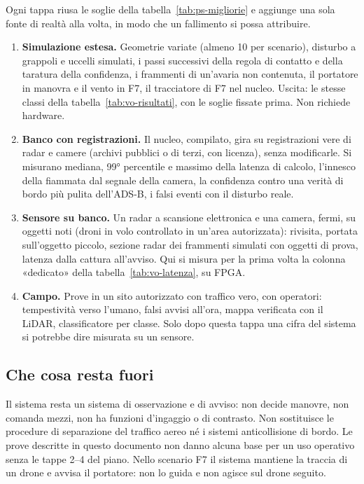 Ogni tappa riusa le soglie della tabella~\ref{tab:ps-migliorie} e aggiunge una sola fonte di realtà alla volta, in modo che un fallimento si possa attribuire.
\begin{enumerate}[label=\arabic*.]
\item \textbf{Simulazione estesa.} Geometrie variate (almeno 10 per scenario), disturbo a grappoli e uccelli simulati, i passi successivi della regola di contatto e della taratura della confidenza, i frammenti di un'avaria non contenuta, il portatore in manovra e il vento in F7, il tracciatore di F7 nel nucleo. Uscita: le stesse classi della tabella~\ref{tab:vo-risultati}, con le soglie fissate prima. Non richiede hardware.
\item \textbf{Banco con registrazioni.} Il nucleo, compilato, gira su registrazioni vere di radar e camere (archivi pubblici o di terzi, con licenza), senza modificarle. Si misurano mediana, 99° percentile e massimo della latenza di calcolo, l'innesco della fiammata dal segnale della camera, la confidenza contro una verità di bordo più pulita dell'ADS-B, i falsi eventi con il disturbo reale.
\item \textbf{Sensore su banco.} Un radar a scansione elettronica e una camera, fermi, su oggetti noti (droni in volo controllato in un'area autorizzata): rivisita, portata sull'oggetto piccolo, sezione radar dei frammenti simulati con oggetti di prova, latenza dalla cattura all'avviso. Qui si misura per la prima volta la colonna «dedicato» della tabella~\ref{tab:vo-latenza}, su FPGA.
\item \textbf{Campo.} Prove in un sito autorizzato con traffico vero, con operatori: tempestività verso l'umano, falsi avvisi all'ora, mappa verificata con il LiDAR, classificatore per classe. Solo dopo questa tappa una cifra del sistema si potrebbe dire misurata su un sensore.
\end{enumerate}

\subsection{Che cosa resta fuori}\label{sec:ps-fuori}

Il sistema resta un sistema di osservazione e di avviso: non decide manovre, non comanda mezzi, non ha funzioni d'ingaggio o di contrasto. Non sostituisce le procedure di separazione del traffico aereo né i sistemi anticollisione di bordo. Le prove descritte in questo documento non danno alcuna base per un uso operativo senza le tappe 2--4 del piano. Nello scenario F7 il sistema mantiene la traccia di un drone e avvisa il portatore: non lo guida e non agisce sul drone seguito.
